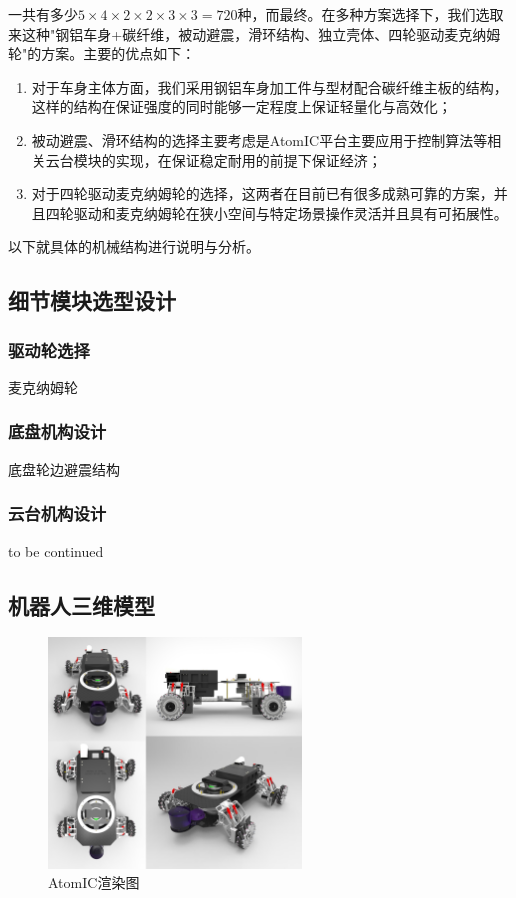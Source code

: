 一共有多少$ 5 \times 4 \times 2 \times 2 \times 3 \times 3 =720 $种，而最终。在多种方案选择下，我们选取来这种"钢铝车身+碳纤维，被动避震，滑环结构、独立壳体、四轮驱动麦克纳姆轮"的方案。主要的优点如下：

\begin{enumerate}
	\item 对于车身主体方面，我们采用钢铝车身加工件与型材配合碳纤维主板的结构，这样的结构在保证强度的同时能够一定程度上保证轻量化与高效化；
	\item 被动避震、滑环结构的选择主要考虑是AtomIC平台主要应用于控制算法等相关云台模块的实现，在保证稳定耐用的前提下保证经济；
	\item 对于四轮驱动麦克纳姆轮的选择，这两者在目前已有很多成熟可靠的方案，并且四轮驱动和麦克纳姆轮在狭小空间与特定场景操作灵活并且具有可拓展性。
	
\end{enumerate}

以下就具体的机械结构进行说明与分析。

\subsection{细节模块选型设计}

\subsubsection{驱动轮选择}

麦克纳姆轮


\subsubsection{底盘机构设计}

底盘轮边避震结构


\subsubsection{云台机构设计}

to be continued


\subsection{机器人三维模型}

\begin{figure}[htbp]
	\centering
	\includegraphics[width = 0.6\textwidth]{fig/xcsst.png}
	\caption{AtomIC渲染图}
	\label{xcsst}
\end{figure}


